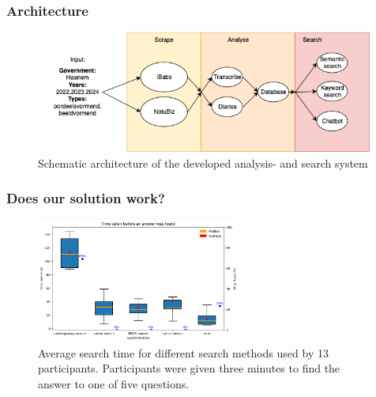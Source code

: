 \documentclass[aspectratio=169,sidebar]{uva-inf-presentation}
\begin{document}
\begin{frame}\frametitle{Architecture}
\begin{figure}
    \centering
    \includegraphics[width=0.99\textwidth]{images/arch.png}
    \caption{Schematic architecture of the developed analysis- and search system}
    \label{fig:pipeline}
\end{figure}
\end{frame}



\begin{frame}\frametitle{Does our solution work?}
\begin{figure}
    \centering
    \includegraphics[width=0.6\textwidth]{images/search_engine_results_2.png}
    \caption{Average search time for different search methods used by 13 participants. Participants were given three minutes to find the answer to one of five questions.}
    \label{fig:pipeline}
\end{figure}
\end{frame}
\end{document}
